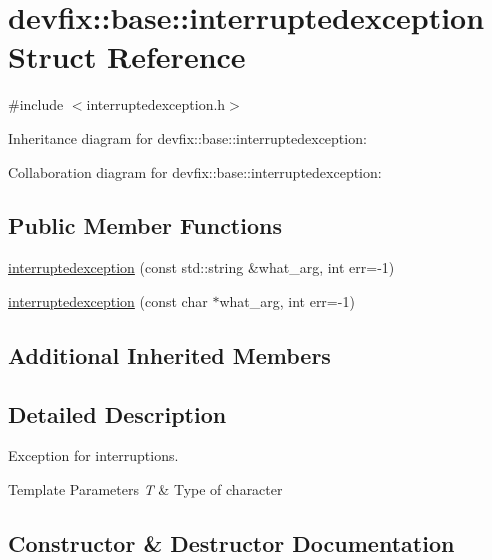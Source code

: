 \hypertarget{structdevfix_1_1base_1_1interruptedexception}{}\section{devfix\+:\+:base\+:\+:interruptedexception Struct Reference}
\label{structdevfix_1_1base_1_1interruptedexception}


{\ttfamily \#include $<$interruptedexception.\+h$>$}



Inheritance diagram for devfix\+:\+:base\+:\+:interruptedexception\+:


Collaboration diagram for devfix\+:\+:base\+:\+:interruptedexception\+:
\subsection*{Public Member Functions}
\begin{DoxyCompactItemize}
\item 
\hyperlink{structdevfix_1_1base_1_1interruptedexception_ac7860de3d6456588f4afb1cb5b517ff5}{interruptedexception} (const std\+::string \&what\+\_\+arg, int err=-\/1)
\item 
\hyperlink{structdevfix_1_1base_1_1interruptedexception_a3115c6a0ad2a463d04629df99ec4d119}{interruptedexception} (const char $\ast$what\+\_\+arg, int err=-\/1)
\end{DoxyCompactItemize}
\subsection*{Additional Inherited Members}


\subsection{Detailed Description}
Exception for interruptions. 
\begin{DoxyTemplParams}{Template Parameters}
{\em T} & Type of character \\
\hline
\end{DoxyTemplParams}


\subsection{Constructor \& Destructor Documentation}
\mbox{\label{structdevfix_1_1base_1_1interruptedexception_ac7860de3d6456588f4afb1cb5b517ff5}} 
